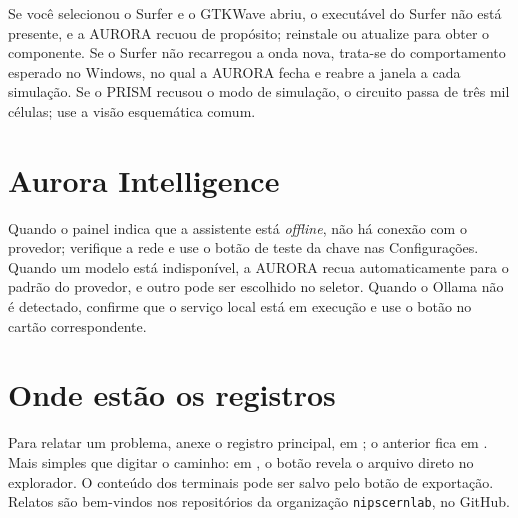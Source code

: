 Se você selecionou o Surfer e o GTKWave abriu, o executável do Surfer não está presente, e a AURORA recuou de propósito; reinstale ou atualize para obter o componente. Se o Surfer não recarregou a onda nova, trata-se do comportamento esperado no Windows, no qual a AURORA fecha e reabre a janela a cada simulação. Se o PRISM recusou o modo de simulação, o circuito passa de três mil células; use a visão esquemática comum.

\section{Aurora Intelligence}

Quando o painel indica que a assistente está \textit{offline}, não há conexão com o provedor; verifique a rede e use o botão de teste da chave nas Configurações. Quando um modelo está indisponível, a AURORA recua automaticamente para o padrão do provedor, e outro pode ser escolhido no seletor. Quando o Ollama não é detectado, confirme que o serviço local está em execução e use o botão  no cartão correspondente.

\section{Onde estão os registros}

Para relatar um problema, anexe o registro principal, em ; o anterior fica em . Mais simples que digitar o caminho: em , o botão  revela o arquivo direto no explorador. O conteúdo dos terminais pode ser salvo pelo botão de exportação. Relatos são bem-vindos nos repositórios da organização \texttt{nipscernlab}, no GitHub.
